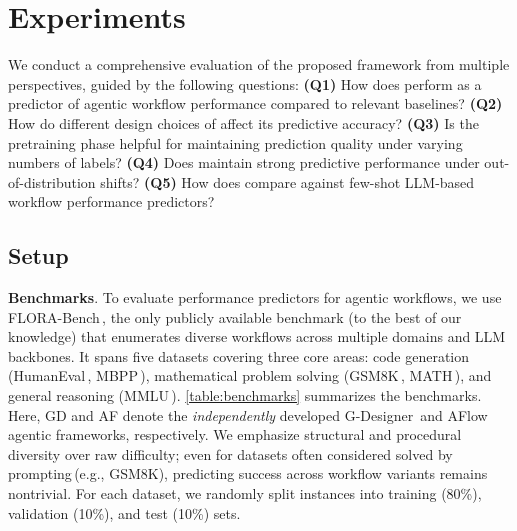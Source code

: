 \vspace*{-0.2cm}
\section{Experiments} \label{section:experiments}
\vspace*{-0.2cm}

We conduct a comprehensive evaluation of the proposed \ours{} framework from multiple perspectives, guided by the following questions: \textbf{(Q1)} How does \ours{} perform as a predictor of agentic workflow performance compared to relevant baselines? \textbf{(Q2)} How do different design choices of \ours{} affect its predictive accuracy? \textbf{(Q3)} Is the pretraining phase helpful for maintaining prediction quality under varying numbers of labels? \textbf{(Q4)} Does \ours{} maintain strong predictive performance under out-of-distribution shifts? \textbf{(Q5)} How does \ours{} compare against few-shot LLM-based workflow performance predictors?

\vspace*{-0.3cm}
\subsection{Setup} \label{section:setup}
\vspace*{-0.2cm}



\textbf{Benchmarks}. To evaluate performance predictors for agentic workflows, we use FLORA-Bench\,\citep{FLORA_Bench_25}, the only publicly available benchmark (to the best of our knowledge) that enumerates diverse workflows across multiple domains and LLM backbones. It spans five datasets covering three core areas: code generation (HumanEval\,\citep{HumanEval}, MBPP\,\citep{MBPP}), mathematical problem solving (GSM8K\,\citep{GSM8K}, MATH\,\citep{MATH_NeurIPS_21}), and general reasoning (MMLU\,\citep{MMLU}). \autoref{table:benchmarks} summarizes the benchmarks. Here, GD and AF denote the \emph{independently} developed G-Designer\,\citep{GDesigner_ICML_25} and AFlow\,\citep{AFlow_ICLR_25} agentic frameworks, respectively. We emphasize structural and procedural diversity over raw difficulty; even for datasets often considered solved by prompting\,(e.g., GSM8K), predicting success across workflow variants remains nontrivial. For each dataset, we randomly split instances into training (80\%), validation (10\%), and test (10\%) sets.

